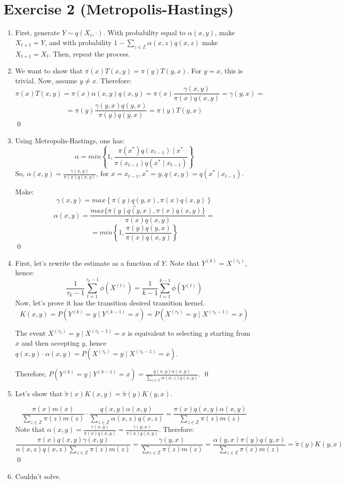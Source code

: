 \documentclass[12pt,letterpaper]{article}
\begin{document}
\section*{Exercise 2 (Metropolis-Hastings)}
\begin{enumerate}[leftmargin=!,labelindent=5pt]
\item First, generate $Y \sim q(X_t, \cdot)$. 
With probability equal to $\alpha(x,y)$, make $X_{t+1} = Y$, and with
probability $1 - \sum_{z \in \mathbb Z} \alpha(x,z)q(x,z)$ make
$X_{t+1} = X_t$. Then, repeat the process.

\item We want to show that $\pi(x)T(x,y) = \pi(y)T(y,x)$.
For $y=x$, this is trivial. Now, assume $y\neq x$. Therefore:
$$
\pi(x)T(x,y) = \pi(x)\alpha(x,y)q(x,y) =
\pi(x)\frac{\gamma(x,y)}{\pi(x)q(x,y)} = \gamma(y,x) =
$$
$$
= 
\pi(y)\frac{\gamma(y,x)q(y,x)}{\pi(y)q(y,x)} = \pi(y)T(y,x)
$$
\qed


\item Using Metropolis-Hastings, one has:
$$ \alpha = min \left\{ 
1, \frac{\pi(x^*)q(x_{t-1}) \mid x^*}{\pi(x_{t-1})q(x^*\mid x_{t-1})}
\right\}$$
So, $\alpha(x,y) = \frac{\gamma(x,y)}{\pi(x)q(x,y)}$, for
$x = x_{t-1}, x^* = y, q(x,y) = q(x^* \mid x_{t-1})$.

Make:
$$ \gamma(x,y) = max \left\{ 
\pi(y)q(y,x),\pi(x)q(x,y)
\right\}$$
$$ \therefore $$
$$\alpha(x,y) =
\frac{max\{ \pi(y)q(y,x), \pi(x)q(x,y)\}}{\pi(x)q(x,y)} = 
$$
$$ = min \left\{ 
1, \frac{\pi(y)q(y,x)}{\pi(x)q(x,y)}
\right\}$$
\qed

\item First, let's rewrite the estimate as a function of $Y$.
Note that $Y^{(k)} = X^{(\tau_k)}$, hence:
$$
\frac{1}{\tau_k - 1} \sum_{t=1}^{\tau_k-1} \phi(X^{(t)}) =
\frac{1}{k - 1} \sum_{t=1}^{k-1} \phi(Y^{(t)})
$$
Now, let's prove it has the transition desired transition kernel.
$$
K(x,y) = P(Y^{(k)}= y \mid Y^{(k-1)}=x) =
P(X^{(\tau_k)}=y \mid X^{(\tau_k -1)}=x)
$$

The event $X^{(\tau_k)}=y \mid X^{(\tau_k -1)}=x$ is equivalent
to selecting $y$ starting from $x$ and then accepting $y$, hence
$q(x,y)\cdot \alpha(x,y) = P(X^{(\tau_k)}=y \mid X^{(\tau_k -1)}=x)$.

Therefore, $P(Y^{(k)}= y \mid Y^{(k-1)}=x) =
\frac{q(x,y)\alpha(x,y)}{\sum_{z \in \mathbb Z}\alpha(x,z)q(x,y)} $.
\qed

\item Let's show that
$
\tilde{\pi}(x)K(x,y) = \tilde{\pi}(y)K(y,x)
$.

$$
\frac{\pi(x)m(x)}{\sum_{z \in \mathbb{Z}}\pi(z)m(z)} \cdot 
\frac{q(x,y)\alpha(x,y)}{\sum_{z \in \mathbb{Z}}\alpha(x,z)q(x,z)}
=
\frac{\pi(x)q(x,y)\alpha(x,y)}
{\sum_{z \in \mathbb{Z}}\pi(z)m(z)}
$$
Note that $\alpha(x,y) =
\frac{\gamma(x,y)}{\pi(x)q(x,y)} =
\frac{\gamma(y,x)}{\pi(x)q(x,y)}$. Therefore:
$$
\frac{\pi(x)q(x,y)\gamma(x,y)}
{\alpha(x,z)q(x,z)\sum_{z \in \mathbb{Z}}\pi(z)m(z)} = 
\frac{\gamma(y,x)}
{\sum_{z \in \mathbb{Z}}\pi(z)m(z)} =
\frac{\alpha(y,x)\pi(y)q(y,x)}{\sum_{z \in \mathbb{Z}}\pi(z)m(z)}=
\tilde{\pi}(y)K(y,x)
$$
\qed

\item Couldn't solve.

\end{enumerate}
\end{document}
